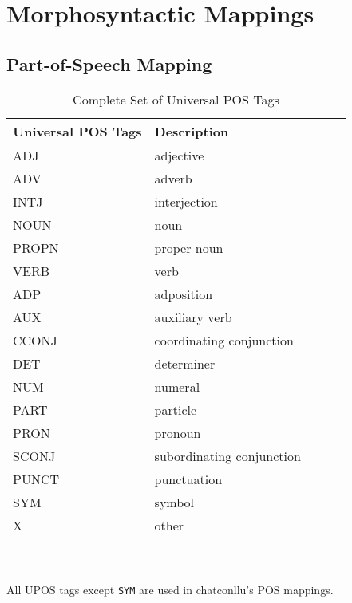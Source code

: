  
\chapter{Morphosyntactic Mappings}
\label{appendixa}

\section{Part-of-Speech Mapping}

\begin{table}[h!]
\caption {Complete Set of Universal POS Tags} \label{tab:uposset}
\begin{tabular}{@{}lllll@{}}
\toprule
\textbf{Universal POS Tags} & \textbf{Description}\\ \midrule
ADJ & adjective\\
ADV & adverb\\
INTJ & interjection\\
NOUN & noun\\
PROPN & proper noun\\
VERB & verb\\\midrule
ADP & adposition\\
AUX & auxiliary verb\\
CCONJ & coordinating conjunction\\
DET & determiner\\
NUM & numeral\\
PART & particle\\
PRON & pronoun\\
SCONJ & subordinating conjunction\\\midrule
PUNCT & punctuation\\
SYM & symbol\\
X & other\\\bottomrule
\end{tabular}\\
\vspace{0.5cm}\\
All UPOS tags except \texttt{SYM} are used in chatconllu's POS mappings.\\
\end{table}

